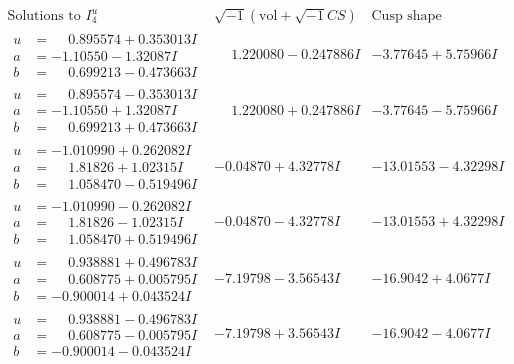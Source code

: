 \documentclass[1p]{elsarticle_modified}
\theoremstyle{definition}
\newcommand{\I}{\sqrt{-1}}
\begin{document}
$$\begin{array}{c|c|c}  
\text{Solutions to }I^u_{4}& \I (\text{vol} + \sqrt{-1}CS) & \text{Cusp shape}\\
 \hline 
\begin{aligned}
u &= \phantom{-}0.895574 + 0.353013 I \\
a &= -1.10550 - 1.32087 I \\
b &= \phantom{-}0.699213 - 0.473663 I\end{aligned}
 & \phantom{-}1.220080 - 0.247886 I & -3.77645 + 5.75966 I \\ \hline\begin{aligned}
u &= \phantom{-}0.895574 - 0.353013 I \\
a &= -1.10550 + 1.32087 I \\
b &= \phantom{-}0.699213 + 0.473663 I\end{aligned}
 & \phantom{-}1.220080 + 0.247886 I & -3.77645 - 5.75966 I \\ \hline\begin{aligned}
u &= -1.010990 + 0.262082 I \\
a &= \phantom{-}1.81826 + 1.02315 I \\
b &= \phantom{-}1.058470 - 0.519496 I\end{aligned}
 & -0.04870 + 4.32778 I & -13.01553 - 4.32298 I \\ \hline\begin{aligned}
u &= -1.010990 - 0.262082 I \\
a &= \phantom{-}1.81826 - 1.02315 I \\
b &= \phantom{-}1.058470 + 0.519496 I\end{aligned}
 & -0.04870 - 4.32778 I & -13.01553 + 4.32298 I \\ \hline\begin{aligned}
u &= \phantom{-}0.938881 + 0.496783 I \\
a &= \phantom{-}0.608775 + 0.005795 I \\
b &= -0.900014 + 0.043524 I\end{aligned}
 & -7.19798 - 3.56543 I & -16.9042 + 4.0677 I \\ \hline\begin{aligned}
u &= \phantom{-}0.938881 - 0.496783 I \\
a &= \phantom{-}0.608775 - 0.005795 I \\
b &= -0.900014 - 0.043524 I\end{aligned}
 & -7.19798 + 3.56543 I & -16.9042 - 4.0677 I \\ \hline\begin{aligned}

\end{aligned}
\end{array}$$
\end{document}
